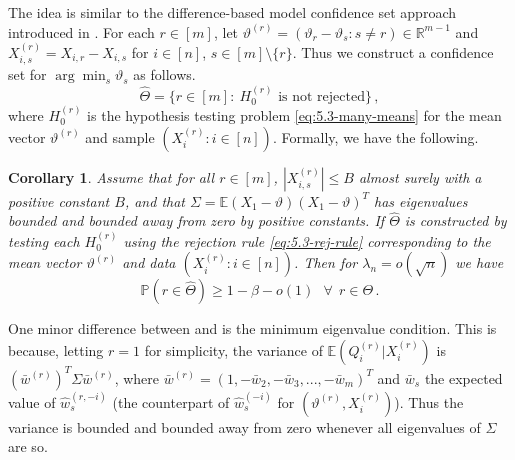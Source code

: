 \documentclass[11pt]{article}
\theoremstyle{plain}
\newtheorem{corollary}[theorem]{Corollary}
\begin{document}
The idea is similar to the difference-based model confidence set approach introduced in .
For each $r\in[m]$, let $\vartheta^{(r)}=(\vartheta_r-\vartheta_s:s\neq r)\in \mathbb R^{m-1}$ and $X_{i,s}^{(r)}=X_{i,r}-X_{i,s}$ for $i\in[n]$, $s\in [m]\setminus\{r\}$.
Thus we construct a confidence set for $\arg\min_s\vartheta_s$ as follows.
$$
\hat\Theta = \{r\in[m]:~H_0^{(r)}\text{ is not rejected}\}\,,
$$
where $H_0^{(r)}$ is the hypothesis testing problem \eqref{eq:5.3-many-means} for the mean vector $\vartheta^{(r)}$ and sample $(X_i^{(r)}:i\in[n])$.
Formally, we have the following.
\begin{corollary}
\label{cor:5.3-argmin-conf-set}
Assume that for all $r\in[m]$, $|X_{i,s}^{(r)}|\le B$ almost surely with a positive constant $B$, and that
$\Sigma=\mathbb E(X_1-\vartheta)(X_1-\vartheta)^T$ has eigenvalues bounded and bounded away from zero by positive constants.  If $\hat\Theta$ is constructed by testing each $H_0^{(r)}$ using the rejection rule \eqref{eq:5.3-rej-rule} corresponding to the mean vector $\vartheta^{(r)}$ and data $(X_i^{(r)}:i\in [n])$.   Then for $\lambda_n=o(\sqrt{n})$ we have
$$
\mathbb P(r\in \hat\Theta)\ge 1-\beta-o(1) ~~~\forall~~r\in\Theta\,.
$$
\end{corollary}
One minor difference between  and  is the minimum eigenvalue condition. This is because, letting $r=1$ for simplicity, the variance of $\mathbb E(Q_i^{(r)}|X_i^{(r)})$ is $(\bar w^{(r)})^T\Sigma \bar w^{(r)}$, where
$\bar w^{(r)}=(1,-\bar w_2,-\bar w_3,...,-\bar w_m)^T$  and $\bar w_s$ the expected value of $\hat w_s^{(r,-i)}$ (the counterpart of $\hat w_s^{(-i)}$ for $(\vartheta^{(r)},X_i^{(r)})$).  Thus the variance is bounded and bounded away from zero whenever all eigenvalues of $\Sigma$ are so.


\end{document}
